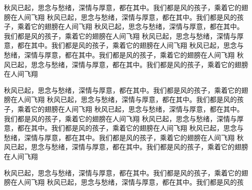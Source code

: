 秋风已起，思念与愁绪，深情与厚意，都在其中。我们都是风的孩子，乘着它的翅膀在人间飞翔
秋风已起，思念与愁绪，深情与厚意，都在其中。我们都是风的孩子，乘着它的翅膀在人间飞翔
秋风已起，思念与愁绪，深情与厚意，都在其中。我们都是风的孩子，乘着它的翅膀在人间飞翔
秋风已起，思念与愁绪，深情与厚意，都在其中。我们都是风的孩子，乘着它的翅膀在人间飞翔
秋风已起，思念与愁绪，深情与厚意，都在其中。我们都是风的孩子，乘着它的翅膀在人间飞翔
秋风已起，思念与愁绪，深情与厚意，都在其中。我们都是风的孩子，乘着它的翅膀在人间飞翔

秋风已起，思念与愁绪，深情与厚意，都在其中。我们都是风的孩子，乘着它的翅膀在人间飞翔
秋风已起，思念与愁绪，深情与厚意，都在其中。我们都是风的孩子，乘着它的翅膀在人间飞翔
秋风已起，思念与愁绪，深情与厚意，都在其中。我们都是风的孩子，乘着它的翅膀在人间飞翔
秋风已起，思念与愁绪，深情与厚意，都在其中。我们都是风的孩子，乘着它的翅膀在人间飞翔
秋风已起，思念与愁绪，深情与厚意，都在其中。我们都是风的孩子，乘着它的翅膀在人间飞翔
秋风已起，思念与愁绪，深情与厚意，都在其中。我们都是风的孩子，乘着它的翅膀在人间飞翔

秋风已起，思念与愁绪，深情与厚意，都在其中。我们都是风的孩子，乘着它的翅膀在人间飞翔
秋风已起，思念与愁绪，深情与厚意，都在其中。我们都是风的孩
